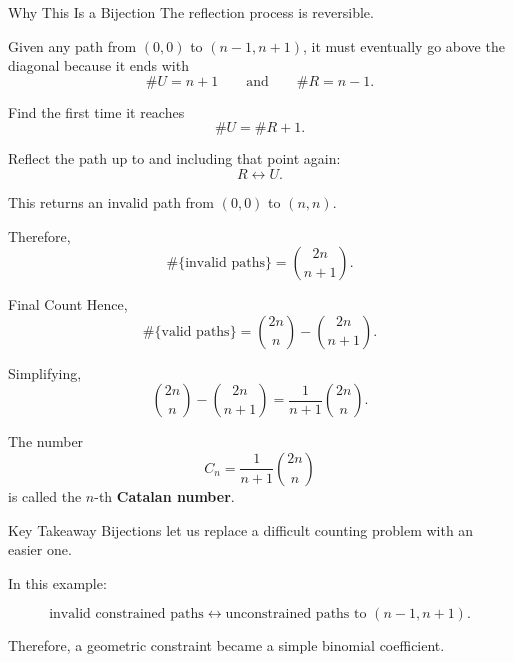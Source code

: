 \begin{frame}{Why This Is a Bijection}
  The reflection process is reversible.

  \vspace{0.6em}

  Given any path from \((0,0)\) to \((n-1,n+1)\), it must eventually go above
  the diagonal because it ends with
  \[
    \#U = n+1
    \qquad \text{and} \qquad
    \#R = n-1.
  \]

  \vspace{0.6em}

  Find the first time it reaches
  \[
    \#U = \#R + 1.
  \]

  Reflect the path up to and including that point again:
  \[
    R \leftrightarrow U.
  \]

  \vspace{0.6em}

  This returns an invalid path from \((0,0)\) to \((n,n)\).

  \vspace{0.6em}

  Therefore,
  \[
    \#\{\text{invalid paths}\}
    =
    \binom{2n}{n+1}.
  \]
\end{frame}


\begin{frame}{Final Count}
  Hence,
  \[
    \#\{\text{valid paths}\}
    =
    \binom{2n}{n}
    -
    \binom{2n}{n+1}.
  \]

  \vspace{0.8em}

  Simplifying,
  \[
    \binom{2n}{n}
    -
    \binom{2n}{n+1}
    =
    \frac{1}{n+1}\binom{2n}{n}.
  \]

  \vspace{0.8em}

  \begin{sqt:definition}
    The number
    \[
      C_n = \frac{1}{n+1}\binom{2n}{n}
    \]
    is called the \(n\)-th \textbf{Catalan number}.
  \end{sqt:definition}
\end{frame}


\begin{frame}{Key Takeaway}
  Bijections let us replace a difficult counting problem with an easier one.

  \vspace{0.8em}

  In this example:

  \[
    \text{invalid constrained paths}
    \longleftrightarrow
    \text{unconstrained paths to } (n-1,n+1).
  \]

  \vspace{0.8em}

  Therefore, a geometric constraint became a simple binomial coefficient.
\end{frame}

